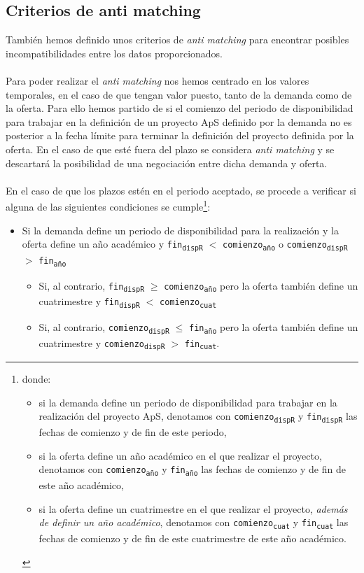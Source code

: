 \documentclass[11pt]{book}
\begin{document}
\subsection{Criterios de anti matching }
También hemos definido unos criterios de \emph{anti matching} para encontrar posibles incompatibilidades entre los datos proporcionados.\\\\
Para poder realizar el \emph{anti matching} nos hemos centrado en los valores temporales, en el caso de que tengan valor puesto, tanto de la demanda como de la oferta. Para ello hemos partido de si el comienzo del periodo de disponibilidad para trabajar en la definición
de un proyecto ApS definido por la demanda no es posterior a la fecha límite para terminar la
definición del proyecto definida por la oferta. En el caso de que esté fuera del plazo se considera \emph{anti matching} y se descartará la posibilidad de una negociación entre dicha demanda y oferta. \\\\
En el caso de que los plazos estén en el periodo aceptado, se procede a
verificar si alguna de las siguientes condiciones se
cumple\footnote{donde:
	\begin{itemize}
		\item si la demanda define un periodo de disponibilidad para trabajar
		en la realización del proyecto ApS, denotamos con
		\texttt{comienzo\textsubscript{dispR}}
		y
		\texttt{fin\textsubscript{dispR}}
		las fechas de comienzo y de fin de este periodo,
		\item si la oferta define un año académico en el que realizar el
		proyecto, denotamos con
		\texttt{comienzo\textsubscript{año}}
		y
		\texttt{fin\textsubscript{año}}
		las fechas de comienzo y de fin de este año académico,
		\item si la oferta define un cuatrimestre en el que realizar el
		proyecto, \emph{además de definir un año académico}, denotamos con
		\texttt{comienzo\textsubscript{cuat}}
		y
		\texttt{fin\textsubscript{cuat}}
		las fechas de comienzo y de fin de este cuatrimestre de este año
		académico.
\end{itemize} }:
\begin{itemize}
	\item Si la demanda define un periodo de disponibilidad para la
	realización y la oferta define un año académico y
	\texttt{fin\textsubscript{dispR}}
	\(<\) \texttt{comienzo\textsubscript{año}}
	o
	\texttt{comienzo\textsubscript{dispR}}
	\(>\) \texttt{fin\textsubscript{año}}
	\begin{itemize}
		\item Si, al contrario,
		\texttt{fin\textsubscript{dispR}}
		\(\geq\) \texttt{comienzo\textsubscript{año}}
		pero la oferta también define un cuatrimestre y
		\texttt{fin\textsubscript{dispR}}
		\(<\) \texttt{comienzo\textsubscript{cuat}}
		\item Si, al contrario,
		\texttt{comienzo\textsubscript{dispR}}
		\(\leq\) \texttt{fin\textsubscript{año}}
		pero la oferta también define un cuatrimestre y
		\texttt{comienzo\textsubscript{dispR}}
		\(>\) \texttt{fin\textsubscript{cuat}}.
	\end{itemize}
\end{itemize}
\end{document}
